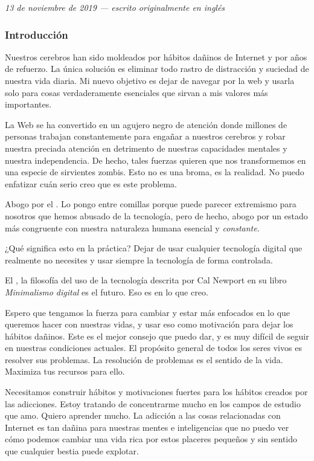 \documentclass[12pt]{article}
\begin{document}
	\textit{13 de noviembre de 2019 --- escrito originalmente en inglés}

	\subsubsection*{Introducción}

	Nuestros cerebros han sido moldeados por hábitos dañinos de Internet y
	por años de refuerzo. La única solución es eliminar todo rastro de
	distracción y suciedad de nuestra vida diaria. Mi nuevo objetivo es
	dejar de navegar por la web y usarla solo para cosas verdaderamente
	esenciales que sirvan a mis valores más importantes.

	La Web se ha convertido en un agujero negro de atención donde millones
	de personas trabajan constantemente para engañar a nuestros cerebros y
	robar nuestra preciada atención en detrimento de nuestras capacidades
	mentales y nuestra independencia. De hecho, tales fuerzas quieren que
	nos transformemos en una especie de sirvientes zombis. Esto no es una
	broma, es la realidad. No puedo enfatizar cuán serio creo que es este
	problema.

	Abogo por el . Lo pongo entre comillas porque
	puede parecer extremismo para nosotros que hemos abusado de la
	tecnología, pero de hecho, abogo por un estado más congruente con
	nuestra naturaleza humana esencial y \textit{constante}.

	¿Qué significa esto en la práctica? Dejar de usar cualquier tecnología
	digital que realmente no necesites y usar siempre la tecnología de forma
	controlada.

	El , la filosofía del uso de la
	tecnología descrita por Cal Newport en su libro \textit{Minimalismo
	digital} es el futuro. Eso es en lo que creo.

	Espero que tengamos la fuerza para cambiar y estar más enfocados en lo
	que queremos hacer con nuestras vidas, y usar eso como motivación para
	dejar los hábitos dañinos. Este es el mejor consejo que puedo dar, y es
	muy difícil de seguir en nuestras condiciones actuales. El propósito
	general de todos los seres vivos es resolver sus problemas. La
	resolución de problemas es el sentido de la vida. Maximiza tus recursos
	para ello.

	Necesitamos construir hábitos y motivaciones fuertes para
	 los hábitos creados por las adicciones. Estoy
	tratando de concentrarme mucho en los campos de estudio que amo. Quiero
	aprender mucho. La adicción a las cosas relacionadas con Internet es tan
	dañina para nuestras mentes e inteligencias que no puedo ver cómo podemos
	cambiar una vida rica por estos placeres pequeños y sin sentido que
	cualquier bestia puede explotar.
\end{document}
